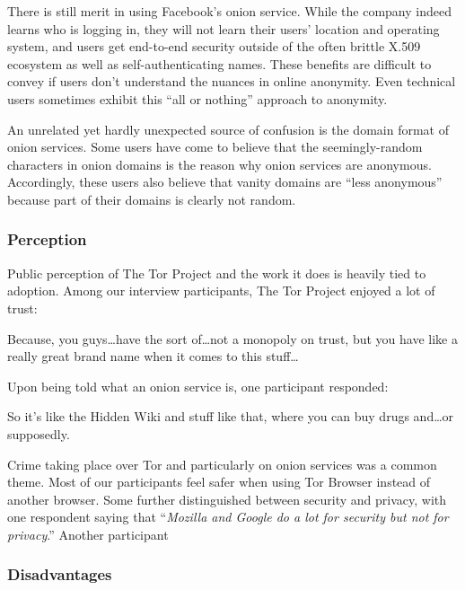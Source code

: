 There is still merit in using Facebook's onion service.  While the company
indeed learns who is logging in, they will not learn their users' location and
operating system, and users get end-to-end security outside of the often brittle
X.509 ecosystem as well as self-authenticating names.  These benefits are
difficult to convey if users don't understand the nuances in online anonymity.
Even technical users sometimes exhibit this ``all or nothing'' approach to
anonymity.

An unrelated yet hardly unexpected source of confusion is the domain format of
onion services.  Some users have come to believe that the seemingly-random
characters in onion domains is the reason why onion services are anonymous.
Accordingly, these users also believe that vanity domains are ``less anonymous''
because part of their domains is clearly not random.

\subsubsection{Perception}

Public perception of The Tor Project and the work it does is heavily tied to
adoption.  Among our interview participants, The Tor Project enjoyed a lot
of trust:

\begin{displayquote}
Because, you guys\dots have the sort of\dots not a monopoly on trust, but you
have like a really great brand name when it comes to this stuff\dots
\end{displayquote}

Upon being told what an onion service is, one participant responded:

\begin{displayquote}
So it's like the Hidden Wiki and stuff like that, where you can buy drugs
and\dots or supposedly.
\end{displayquote}

Crime taking place over Tor and particularly on onion services was a common
theme.  Most of our participants feel safer when using Tor Browser instead of
another browser.  Some further distinguished between security and privacy, with
one respondent saying that ``\emph{Mozilla and Google do a lot for security but
    not for privacy}.''  Another participant 

\subsubsection{Disadvantages}


